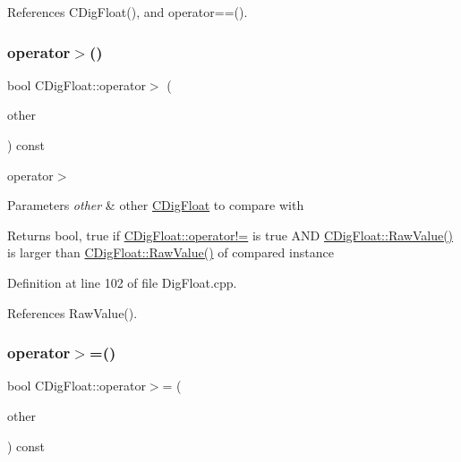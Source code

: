 References C\+Dig\+Float(), and operator==().

\mbox{\label{classCDigFloat_a06b58ba24f51ddcb737c826f2191d4c9}} 
\subsubsection{\texorpdfstring{operator$>$()}{operator>()}}
{\footnotesize\ttfamily bool C\+Dig\+Float\+::operator$>$ (\begin{DoxyParamCaption}\item[{const \hyperlink{classCDigFloat}{C\+Dig\+Float} \&}]{other }\end{DoxyParamCaption}) const}



operator$>$ 


\begin{DoxyParams}{Parameters}
{\em other} & other \hyperlink{classCDigFloat}{C\+Dig\+Float} to compare with \\
\hline
\end{DoxyParams}
\begin{DoxyReturn}{Returns}
bool, true if \hyperlink{classCDigFloat_a15c13c035aff8184491bd9629403a33a}{C\+Dig\+Float\+::operator!=} is true A\+ND \hyperlink{classCDigFloat_ab6d3001a549d7496156321cbb26dde51}{C\+Dig\+Float\+::\+Raw\+Value()} is larger than \hyperlink{classCDigFloat_ab6d3001a549d7496156321cbb26dde51}{C\+Dig\+Float\+::\+Raw\+Value()} of compared instance 
\end{DoxyReturn}


Definition at line 102 of file Dig\+Float.\+cpp.



References Raw\+Value().

\mbox{\label{classCDigFloat_a08f4104630ae80e20f2768c28abea10f}} 
\subsubsection{\texorpdfstring{operator$>$=()}{operator>=()}}
{\footnotesize\ttfamily bool C\+Dig\+Float\+::operator$>$= (\begin{DoxyParamCaption}\item[{const \hyperlink{classCDigFloat}{C\+Dig\+Float} \&}]{other }\end{DoxyParamCaption}) const}



